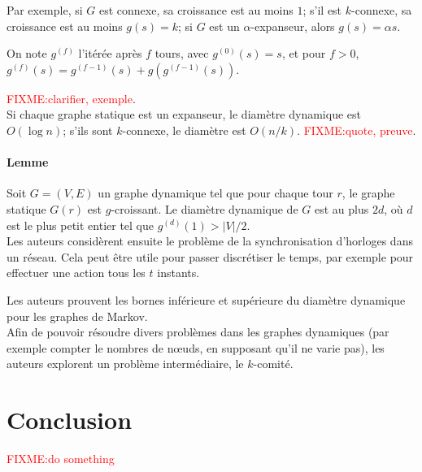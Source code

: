 \documentclass[12pt,a4paper]{article}
\begin{document}
Par exemple, si \(G\) est connexe, sa croissance est au moins \(1\);
s'il est \(k\)-connexe, sa croissance est au moins \(g(s) = k\); si
\(G\) est un \(\alpha\)-expanseur, alors \(g(s) = \alpha s\).

On note \(g^{(f)}\) l'itérée après \(f\) tours, avec
\(g^{(0)}(s) = s\), et pour \(f > 0\),
\(g^{(f)}(s) = g^{(f-1)}(s) + g(g^{(f-1)}(s))\).

\textcolor{red}{FIXME:\@ clarifier, exemple}.\\

Si chaque graphe statique est un expanseur, le diamètre dynamique est
\(O(\log n)\); s'ils sont \(k\)-connexe, le diamètre est \(O(n/k)\).
\textcolor{red}{FIXME:\@ quote, preuve}.

\paragraph{Lemme} Soit \(G = (V, E)\) un graphe dynamique tel que pour
chaque tour \(r\), le graphe statique \(G(r)\) est \(g\)-croissant. Le
diamètre dynamique de \(G\) est au plus \(2d\), où \(d\) est le plus
petit entier tel que \(g^{(d)}(1) > |V|/2\).\\

Les auteurs considèrent ensuite le problème de la synchronisation
d'horloges dans un réseau. Cela peut être utile pour passer
discrétiser le temps, par exemple pour effectuer une action tous les
\(t\) instants.

Les auteurs prouvent les bornes inférieure et supérieure du
diamètre dynamique pour les graphes de Markov.\\

Afin de pouvoir résoudre divers problèmes dans les graphes dynamiques
(par exemple compter le nombres de nœuds, en supposant qu'il ne varie
pas), les auteurs explorent un problème intermédiaire, le
\(k\)-comité.

\section{Conclusion}
\textcolor{red}{FIXME:\@ do something}

\printbibliography{}
\end{document}
